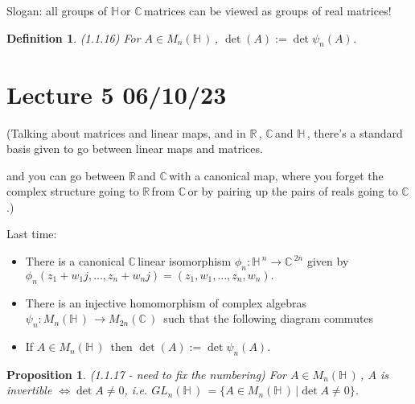 \documentclass[12pt,a4paper]{article}
\newcommand{\rR}{\ensuremath{\mathbb{R}\,}}
\newcommand{\cC}{\ensuremath{\mathbb{C}\,}}
\newcommand{\hH}{\ensuremath{\mathbb{H}\,}}
\newcommand{\mnh}{\ensuremath{M_n(\hH)\,}}
\newcommand{\mc}[1]{\ensuremath{M_{#1}(\cC)\,}}
\newcommand{\glnh}{\ensuremath{GL_n(\hH)\,}}
\newtheorem{defn}[thm]{Definition}
\newtheorem{prop}[thm]{Proposition}
\begin{document}
Slogan: all groups of \hH or \cC matrices can be viewed as groups of real matrices!

\begin{defn}
(1.1.16) For $A\in \mnh$, $\det(A):=\det \psi_n(A)$.
\end{defn}

\section{Lecture 5 06/10/23}

(Talking about matrices and linear maps, and in \rR , \cC and \hH, there's a standard basis given to go between linear maps and matrices.

\begin{center}
\end{center}
and you can go between \rR and \cC with a canonical map, where you forget the complex structure going to \rR from \cC or by pairing up the pairs of reals going to \cC .)

Last time:

\begin{itemize}
\item There is a canonical \cC linear isomorphism $\phi_n:\hH^n\to \cC^{2n}$ given by $\phi_n(z_1+w_1 j, \ldots, z_n+w_n j)=(z_1,w_1,\ldots,z_n, w_n).$
\item There is an injective homomorphism of complex algebras $\psi_n: \mnh \to \mc{2n}$ such that the following diagram commutes
\begin{center}
\end{center}
\item If $A\in \mnh$ then $\det(A):=\det \psi_n(A)$.
\end{itemize}

\begin{prop}
(1.1.17 - need to fix the numbering) For $A\in \mnh$, $A$ is invertible $\iff \det A \neq 0$, i.e. $\glnh=\{A\in \mnh | \det A \neq 0\}$.
\end{prop}
\end{document}
